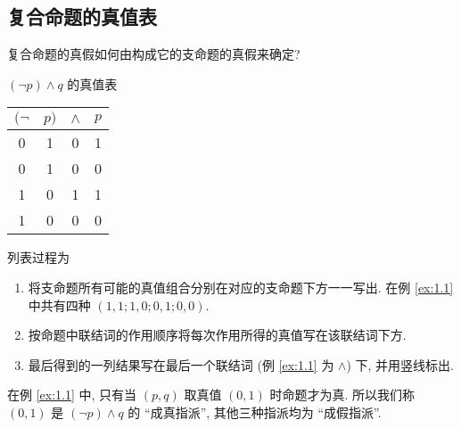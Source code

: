\documentclass[
    mode=hazy,
    color=blue,
    device=normal,
    lang=cn
]{elegantnote}
\begin{document}
        \subsection{复合命题的真值表}
        复合命题的真假如何由构成它的支命题的真假来确定?
        \begin{example}\label{ex:1.1}
            $(\lnot p)\land q$ 的真值表
            \begin{table}[!htbp]
                \centering
                \begin{tabular}{cc|c|c}
                    $(\lnot$ & $p)$ & $\land$ & $p$\\
                    \hline
                    0 & 1 & 0 & 1\\
                    0 & 1 & 0 & 0\\
                    1 & 0 & 1 & 1\\
                    1 & 0 & 0 & 0
                \end{tabular}
            \end{table}
        \end{example}
        列表过程为
        \begin{enumerate}
            \item 将支命题所有可能的真值组合分别在对应的支命题下方一一写出. 在例 \ref{ex:1.1} 中共有四种 $(1, 1; 1, 0; 0, 1; 0, 0)$.
            \item 按命题中联结词的作用顺序将每次作用所得的真值写在该联结词下方.
            \item 最后得到的一列结果写在最后一个联结词 (例 \ref{ex:1.1} 为 $\land$) 下, 并用竖线标出.
        \end{enumerate}
        在例 \ref{ex:1.1} 中, 只有当 $(p, q)$ 取真值 $(0,1)$ 时命题才为真. 所以我们称 $(0,1)$ 是 $(\lnot p)\land q$ 的 ``成真指派'', 其他三种指派均为 ``成假指派''.
\end{document}
